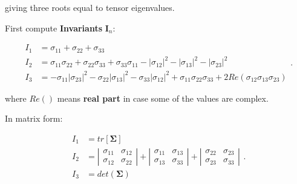 \begin{itemize}
        giving three roots equal to tensor eigenvalues.

        First compute \textbf{Invariants} $\mathbf{I}_{n}$:

        \begin{equation}
            \begin{array}{ll}
                I_{1} &= \sigma_{11} + \sigma_{22} + \sigma_{33} \\
                I_{2} &= \sigma_{11}\sigma_{22} + \sigma_{22}\sigma_{33} + \sigma_{33}\sigma_{11}
                - \left|\sigma_{12}\right|^{2}
                - \left|\sigma_{13}\right|^{2}
                - \left|\sigma_{23}\right|^{2} \\
                I_{3}
                &=
                - \sigma_{11}\left|\sigma_{23}\right|^{2}
                - \sigma_{22}\left|\sigma_{13}\right|^{2}
                - \sigma_{33}\left|\sigma_{12}\right|^{2}
                + \sigma_{11}\sigma_{22}\sigma_{33}
                + 2Re\left(\sigma_{12}\sigma_{13}\sigma_{23}\right)
            \end{array}
        .\end{equation}

        where $ Re() $ means \textbf{real part} in case some of the values are complex.

        In matrix form:

        \begin{equation}
            \begin{array}{ll}
                I_{1} &= tr[\mathbf{\Sigma}] \\
                I_{2} &= \left| \begin{matrix}
                    \sigma_{11} & \sigma_{12} \\
                    \sigma_{12} & \sigma_{22}
                \end{matrix} \right| + \left| \begin{matrix}
                    \sigma_{11} & \sigma_{13} \\
                    \sigma_{13} & \sigma_{33}
                \end{matrix} \right| + \left| \begin{matrix}
                    \sigma_{22} & \sigma_{23} \\
                    \sigma_{23} & \sigma_{33}
                \end{matrix} \right| \\
                    I_{3} &= det(\mathbf{\Sigma})
            \end{array}
        .\end{equation}


\end{itemize}
